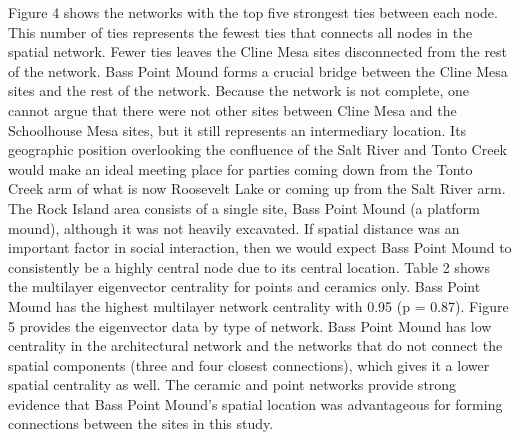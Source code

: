 \documentclass[]{interact}
\theoremstyle{plain}%
\theoremstyle{definition}
\theoremstyle{remark}
\begin{document}
Figure 4 shows the networks with the top five strongest ties between
each node. This number of ties represents the fewest ties that connects
all nodes in the spatial network. Fewer ties leaves the Cline Mesa sites
disconnected from the rest of the network. Bass Point Mound forms a
crucial bridge between the Cline Mesa sites and the rest of the network.
Because the network is not complete, one cannot argue that there were
not other sites between Cline Mesa and the Schoolhouse Mesa sites, but
it still represents an intermediary location. Its geographic position
overlooking the confluence of the Salt River and Tonto Creek would make
an ideal meeting place for parties coming down from the Tonto Creek arm
of what is now Roosevelt Lake or coming up from the Salt River arm. The
Rock Island area consists of a single site, Bass Point Mound (a platform
mound), although it was not heavily excavated. If spatial distance was
an important factor in social interaction, then we would expect Bass
Point Mound to consistently be a highly central node due to its central
location. Table 2 shows the multilayer eigenvector centrality for points
and ceramics only. Bass Point Mound has the highest multilayer network
centrality with 0.95 (p = 0.87). Figure 5 provides the eigenvector data
by type of network. Bass Point Mound has low centrality in the
architectural network and the networks that do not connect the spatial
components (three and four closest connections), which gives it a lower
spatial centrality as well. The ceramic and point networks provide
strong evidence that Bass Point Mound's spatial location was
advantageous for forming connections between the sites in this study.
\end{document}

